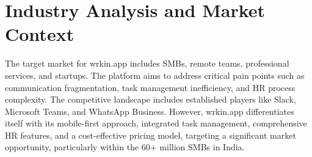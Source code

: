 \section{Industry Analysis and Market Context}
The target market for wrkin.app includes SMBs, remote teams, professional services, and startups. The platform aims to address critical pain points such as communication fragmentation, task management inefficiency, and HR process complexity. The competitive landscape includes established players like Slack, Microsoft Teams, and WhatsApp Business. However, wrkin.app differentiates itself with its mobile-first approach, integrated task management, comprehensive HR features, and a cost-effective pricing model, targeting a significant market opportunity, particularly within the 60+ million SMBs in India.